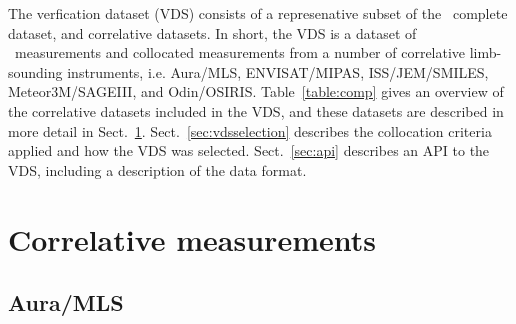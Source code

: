 The verfication dataset (VDS) consists of a represenative subset of 
the \smr\ complete dataset, and correlative datasets.
In short, the VDS is a dataset of \smr\ measurements 
and collocated measurements from a number of correlative
limb-sounding instruments, i.e. Aura/MLS, ENVISAT/MIPAS,
ISS/JEM/SMILES, Meteor3M/SAGEIII, and Odin/OSIRIS.
Table~\ref{table:comp} gives an overview of the correlative
datasets included in the VDS, and these datasets
are described in more detail in Sect.~\ref{sec:corrmeas}.
Sect.~\ref{sec:vdsselection} describes the collocation criteria
applied and how the VDS was selected. 
Sect.~\ref{sec:api} describes an API to the VDS,
including a description of the data format. 
    

\section{Correlative measurements}
\label{sec:corrmeas}
\subsection{Aura/MLS}

